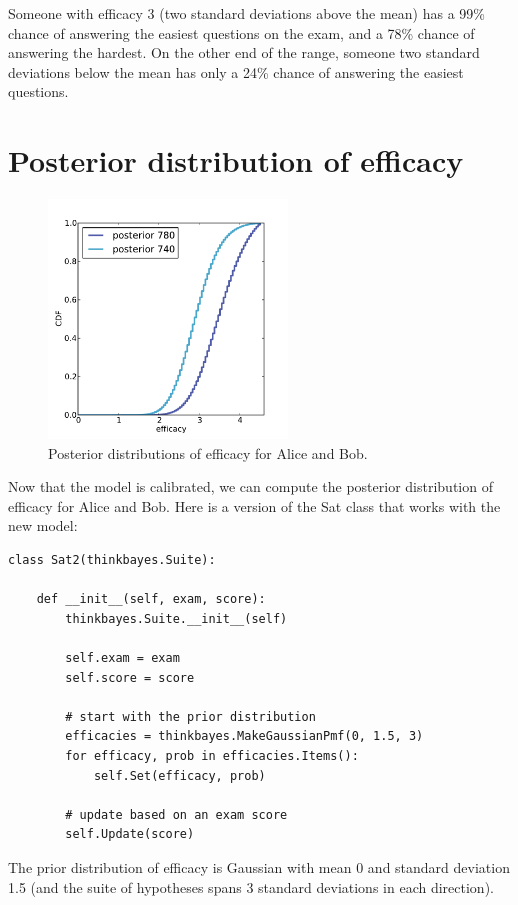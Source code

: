 \documentclass[12pt]{book}
\begin{document}
Someone with efficacy 3 (two standard deviations above
the mean) has a 99\% chance of answering the easiest questions on
the exam, and a 78\% chance of answering the hardest.  On the other
end of the range, someone two standard deviations below the mean
has only a 24\% chance of answering the easiest questions.


\section{Posterior distribution of efficacy}

\begin{figure}
\centerline{\includegraphics[height=2.5in]{figs/sat_posteriors_eff.pdf}}
\caption{Posterior distributions of efficacy for Alice and Bob.}
\label{fig.satposterior2}
\end{figure}

Now that the model is calibrated, we can compute the posterior
distribution of efficacy for Alice and Bob.  Here is a version of the
Sat class that works with the new model:

\begin{verbatim}
class Sat2(thinkbayes.Suite):

    def __init__(self, exam, score):
        thinkbayes.Suite.__init__(self)

        self.exam = exam
        self.score = score

        # start with the prior distribution
        efficacies = thinkbayes.MakeGaussianPmf(0, 1.5, 3)
        for efficacy, prob in efficacies.Items():
            self.Set(efficacy, prob)

        # update based on an exam score
        self.Update(score)
\end{verbatim}

The prior distribution of efficacy is
Gaussian with mean 0 and standard deviation 1.5 (and the suite of
hypotheses spans 3 standard deviations in each direction).
\end{document}
